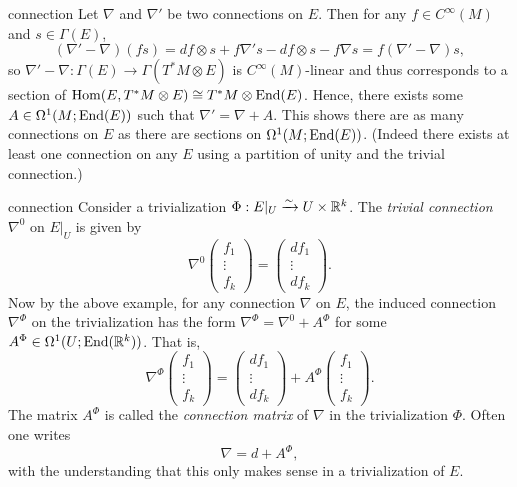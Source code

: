 \begin{example}{connection}
    Let $\nabla$ and $\nabla'$ be two connections on $E$. Then for any $f \in C^\infty(M)$ and $s \in \Gamma(E)$,
    \[ (\nabla' - \nabla) (fs) = df \otimes s + f \nabla' s - df \otimes s - f \nabla s = f(\nabla' - \nabla) s , \]
    so $\nabla' - \nabla : \Gamma(E) \to \Gamma(T^*M \otimes E)$ is $C^\infty(M)$-linear and thus corresponds to a section of $\operatorname{Hom}(E, T^*M \otimes E) \cong T^*M \otimes \textup{End}(E)$. Hence, there exists some $A \in \Omega^1(M; \textup{End}(E))$ such that $\nabla' = \nabla + A$. This shows there are as many connections on $E$ as there are sections on $\Omega^1(M; \textup{End}(E))$. (Indeed there exists at least one connection on any $E$ using a partition of unity and the trivial connection.)
\end{example}

\begin{example}{connection}
    Consider a trivialization $\Phi : E|_U \xrightarrow{\sim} U \times \mathbb{R}^k$. The \textit{trivial connection} $\nabla^0$ on $E|_U$ is given by
    \[ \nabla^0 \begin{pmatrix} f_1 \\ \vdots \\ f_k \end{pmatrix} = \begin{pmatrix} df_1 \\ \vdots \\ df_k \end{pmatrix} . \]
    Now by the above example, for any connection $\nabla$ on $E$, the induced connection $\nabla^\Phi$ on the trivialization has the form $\nabla^\Phi = \nabla^0 + A^\Phi$ for some $A^\Phi \in \Omega^1(U; \textup{End}(\mathbb{R}^k))$. That is,
    \[ \nabla^\Phi \begin{pmatrix} f_1 \\ \vdots \\ f_k \end{pmatrix} = \begin{pmatrix} df_1 \\ \vdots \\ df_k \end{pmatrix} + A^\Phi \begin{pmatrix} f_1 \\ \vdots \\ f_k \end{pmatrix} . \]
    The matrix $A^\Phi$ is called the \textit{connection matrix} of $\nabla$ in the trivialization $\Phi$. Often one writes \[ \nabla = d + A^\Phi , \]
    with the understanding that this only makes sense in a trivialization of $E$.
\end{example}

